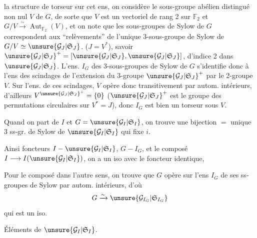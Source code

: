 la structure de torseur sur cet ens, on considère le sous-groupe abélien distingué
 non nul $V$ de $G$, de sorte que $V$ est un vectoriel
de rang 2 sur $\mathbb{F}_2$ et $G/V\xrightarrow{\sim}\operatorname{Aut}_{\mathbb{F}_2}(V)$,
et on note que les sous-groupes de Sylow de $G$ correspondent aux
``relèvements'' de l'unique 3-sous-groupe de Sylow de
$G/V\simeq\unsure{\mathcal{G}_J|\mathfrak{S}_J}$.
($J=V^*$), savoir
$\unsure{\mathcal{G}_J|\mathfrak{S}_J}^+=[\unsure{\mathcal{G}_J|\mathfrak{S}_J},\unsure{\mathcal{G}_J|\mathfrak{S}_J}]$,
d'indice 2 dans $\unsure{\mathcal{G}_J|\mathfrak{S}_J}$.
 L'ens. $I_G$ des 3-sous-groupes de Sylow de $G$
s'identifie donc à l'ens des scindages de l'extension
du 3-groupe $\unsure{\mathcal{G}_J|\mathfrak{S}_J}^+$ par le 2-groupe $V$.
Sur l'ens. de ces scindages, $V$ opère donc transitivement par autom. intérieurs,
d'ailleurs
$V^{\unsure{\mathcal{G}_J|\mathfrak{S}_J}^+}=\{0\}$
($\unsure{\mathcal{G}_J|\mathfrak{S}_J}^+$ est le groupe des permutations circulaires sur
$V^*=J$), donc $I_G$ est bien un torseur sous $V$.

Quand on part de $I$ et  $G=\unsure{\mathcal{G}_I|\mathfrak{S}_I}$,
on trouve une bijection
$=$ unique 3 ss-gr. de Sylow de $\unsure{\mathcal{G}_I|\mathfrak{S}_I}$ qui fixe $i$.

Ainsi  foncteurs
$I\mathbin{-}\unsure{\mathcal{G}_I|\mathfrak{S}_I}$,
$G\mathbin{-}I_G$, et le composé $I\longrightarrow I(\unsure{\mathcal{G}_I|\mathfrak{S}_I})$,
on a un iso avec le  foncteur identique,

Pour le composé dans l'autre sens, on trouve que $G$ opère sur l'ens $I_G$
de ses  ss-groupes de Sylow par autom. intérieurs, d'où
\[
 G\xrightarrow{\sim}\unsure{\mathcal{G}_{I_G}|\mathfrak{S}_{I_G}}
\]
qui est un iso.

Éléments de $\unsure{\mathcal{G}_I|\mathfrak{S}_I}$.

